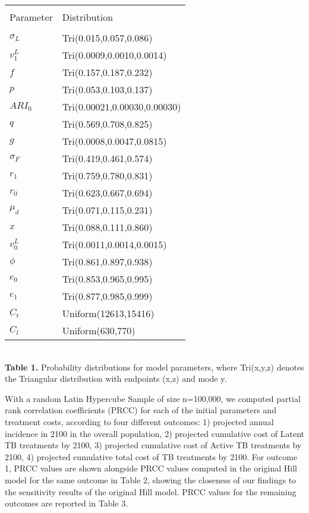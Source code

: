 \documentclass{article}[11pt]
\begin{document}
\begin{table}
\centering
\begin{tabular}{l l}
\hline\hline\\
Parameter & Distribution\\ [0.5ex]
\hline\\
$\sigma_{L}$  & Tri(0.015,0.057,0.086) \\
$v^{L}_{1}$   & Tri(0.0009,0.0010,0.0014) \\
$f$                 & Tri(0.157,0.187,0.232) \\
$p$                & Tri(0.053,0.103,0.137) \\
$ARI_{0}$      & Tri(0.00021,0.00030,0.00030) \\
$q$                & Tri(0.569,0.708,0.825) \\
$g$                & Tri(0.0008,0.0047,0.0815)  \\
$\sigma_{F}$ & Tri(0.419,0.461,0.574) \\
$r_{1}$          & Tri(0.759,0.780,0.831) \\
$r_{0}$          & Tri(0.623,0.667,0.694) \\
$\mu_{d}$      & Tri(0.071,0.115,0.231) \\
$x$                 & Tri(0.088,0.111,0.860) \\
$v^{L}_{0}$   & Tri(0.0011,0.0014,0.0015) \\
$\phi$            & Tri(0.861,0.897,0.938) \\
$e_{0}$          & Tri(0.853,0.965,0.995) \\
$e_{1}$          & Tri(0.877,0.985,0.999) \\
$C_{t}$           & Uniform(12613,15416) \\
$C_{l}$           & Uniform(630,770) \\ [1ex]
\hline
\end{tabular}\\[1ex]

{\bf Table 1.} Probability distributions for model parameters, where Tri(x,y,z) denotes the 
Triangular distribution with endpoints (x,z) and mode y.
\end{table}

With a random Latin Hypercube Sample of size n=100,000, we computed partial rank correlation coefficients (PRCC) for each of the initial parameters and treatment costs, according to four different outcomes: 1) projected annual incidence in 2100 in the overall population, 2) projected cumulative cost of Latent TB treatments by 2100, 3) projected cumulative cost of Active TB treatments by 2100, 4) projected cumulative total cost of TB treatments by 2100.  For outcome 1, PRCC values are shown alongside PRCC values computed in the original Hill model for the same outcome in Table 2, showing the closeness of our findings to the sensitivity results of the original Hill model.  PRCC values for the remaining outcomes are reported in Table 3.  \\
\end{document}
